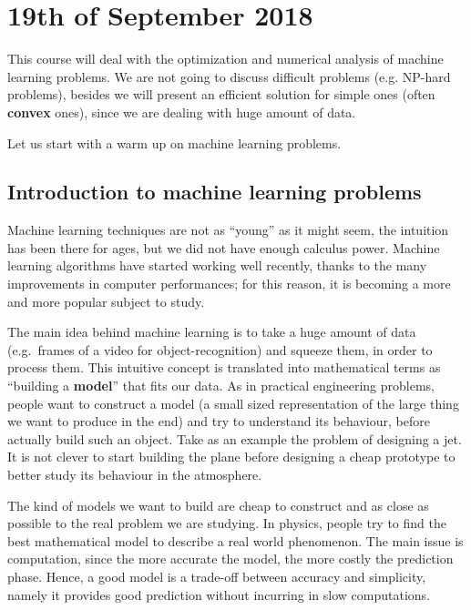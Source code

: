 \documentclass[computationalMathematics.tex]{subfiles}
\begin{document}
\chapter{19th of September 2018}

This course will deal with the optimization and numerical analysis of machine learning problems.
We are not going to discuss difficult problems (e.g. NP-hard problems), besides we will present an efficient solution for simple ones (often \textbf{convex} ones), since we are dealing with huge amount of data.

Let us start with a warm up on machine learning problems.

\section{Introduction to machine learning problems}

Machine learning techniques are not as ``young'' as it might seem, the intuition has been there for ages, but we did not have enough calculus power.
Machine learning algorithms have started working well recently, thanks to the many improvements in computer performances; for this reason, it is becoming a more and more popular subject to study.

The main idea behind machine learning is to take a huge amount of data (e.g.~frames of a video for object-recognition) and squeeze them, in order to process them.
This intuitive concept is translated into mathematical terms as ``building a \textbf{model}'' that fits our data.
As in practical engineering problems, people want to construct a model (a small sized representation of the large thing we want to produce in the end) and try to understand its behaviour, before actually build such an object.
Take as an example the problem of designing a jet.
It is not clever to start building the plane before designing a cheap prototype to better study its behaviour in the atmosphere.

The kind of models we want to build are cheap to construct and as close as possible to the real problem we are studying.
In physics, people try to find the best mathematical model to describe a real world phenomenon.
The main issue is computation, since the more accurate the model, the more costly the prediction phase.
Hence, a good model is a trade-off between accuracy and simplicity, namely it provides good prediction without incurring in slow computations.
\end{document}

